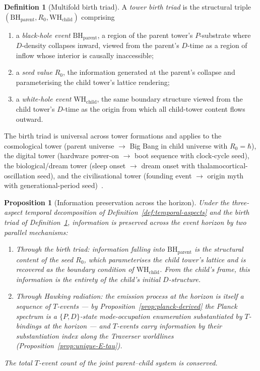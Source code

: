 \documentclass[11pt,a4paper]{article}
\newtheorem{proposition}[theorem]{Proposition}
\theoremstyle{definition}
\newtheorem{definition}[theorem]{Definition}
\theoremstyle{remark}
\begin{document}
\begin{definition}[Multifold birth triad]\label{def:birth-triad}
A \emph{tower birth triad} is the structural triple $(\mathrm{BH}_{\text{parent}}, R_{0}, \mathrm{WH}_{\text{child}})$ comprising
\begin{enumerate}[label=(\roman*),leftmargin=*]
\item a \emph{black-hole event} $\mathrm{BH}_{\text{parent}}$, a region of the parent tower's $P$-substrate where $D$-density collapses inward, viewed from the parent's $D$-time as a region of inflow whose interior is causally inaccessible;
\item a \emph{seed value} $R_{0}$, the information generated at the parent's collapse and parameterising the child tower's lattice rendering;
\item a \emph{white-hole event} $\mathrm{WH}_{\text{child}}$, the same boundary structure viewed from the child tower's $D$-time as the origin from which all child-tower content flows outward.
\end{enumerate}
The birth triad is universal across tower formations and applies to the cosmological tower (parent universe $\to$ Big Bang in child universe with $R_{0} = \hbar$), the digital tower (hardware power-on $\to$ boot sequence with clock-cycle seed), the biological/dream tower (sleep onset $\to$ dream onset with thalamocortical-oscillation seed), and the civilisational tower (founding event $\to$ origin myth with generational-period seed)~\cite{Multifold}.
\end{definition}

\begin{proposition}[Information preservation across the horizon]\label{prop:info-preserve}
Under the three-aspect temporal decomposition of Definition~\ref{def:temporal-aspects} and the birth triad of Definition~\ref{def:birth-triad}, information is preserved across the event horizon by two parallel mechanisms:
\begin{enumerate}[leftmargin=*,label=(\roman*)]
\item Through the birth triad: information falling into $\mathrm{BH}_{\text{parent}}$ is the structural content of the seed $R_{0}$, which parameterises the child tower's lattice and is recovered as the boundary condition of $\mathrm{WH}_{\text{child}}$. From the child's frame, this information is the entirety of the child's initial $D$-structure.
\item Through Hawking radiation: the emission process at the horizon is itself a sequence of $T$-events --- by Proposition~\ref{prop:planck-derived} the Planck spectrum is a $\{P,D\}$-state mode-occupation enumeration substantiated by $T$-bindings at the horizon --- and $T$-events carry information by their substantiation index along the Traverser worldlines (Proposition~\ref{prop:unique-E-tau}).
\end{enumerate}
The total $T$-event count of the joint parent--child system is conserved.
\end{proposition}
\end{document}
